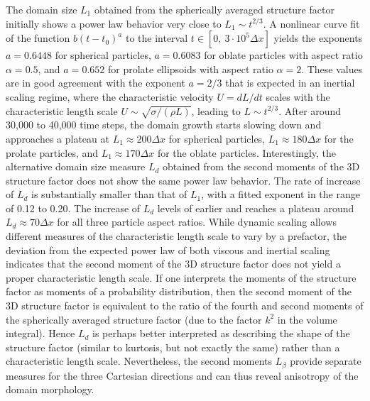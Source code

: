 The domain size \(L_1\) obtained from the spherically averaged structure
factor initially shows a power law behavior very close to
\(L_1\sim t^{2/3}\). A nonlinear curve fit of the function
\(b(t-t_0)^a\) to the interval \(t\in[0,\ 3\cdot10^5\Delta x]\) yields
the exponents \(a=0.6448\) for spherical particles, \(a=0.6083\) for
oblate particles with aspect ratio \(\alpha=0.5\), and \(a=0.652\) for
prolate ellipsoids with aspect ratio \(\alpha=2\). These values are in
good agreement with the exponent \(a=2/3\) that is expected in an
inertial scaling regime, where the characteristic velocity \(U=dL/dt\)
scales with the characteristic length scale
\(U\sim \sqrt{\sigma/(\rho L)}\), leading to \(L \sim t^{2/3}\). After
around 30,000 to 40,000 time steps, the domain growth starts slowing
down and approaches a plateau at \(L_1\approx 200\Delta x\) for
spherical particles, \(L_1\approx 180\Delta x\) for the prolate
particles, and \(L_1\approx 170\Delta x\) for the oblate particles.
Interestingly, the alternative domain size measure \(L_d\) obtained from
the second moments of the 3D structure factor does not show the same
power law behavior. The rate of increase of \(L_d\) is substantially
smaller than that of \(L_1\), with a fitted exponent in the range of
0.12 to 0.20. The increase of \(L_d\) levels of earlier and reaches a
plateau around \(L_d\approx 70\Delta x\) for all three particle aspect
ratios. While dynamic scaling allows different measures of the
characteristic length scale to vary by a prefactor, the deviation from
the expected power law of both viscous and inertial scaling indicates
that the second moment of the 3D structure factor does not yield a
proper characteristic length scale. %
If one interprets the moments of the structure factor as moments of a
probability distribution, then the second moment of the 3D structure
factor is equivalent to the ratio of the fourth and second moments of
the spherically averaged structure factor (due to the factor \(k^2\) in
the volume integral). Hence \(L_d\) is perhaps better interpreted as
describing the shape of the structure factor (similar to kurtosis, but
not exactly the same) rather than a characteristic length scale.
Nevertheless, the second moments \(L_\beta\) provide separate measures
for the three Cartesian directions and can thus reveal anisotropy of the
domain morphology.

